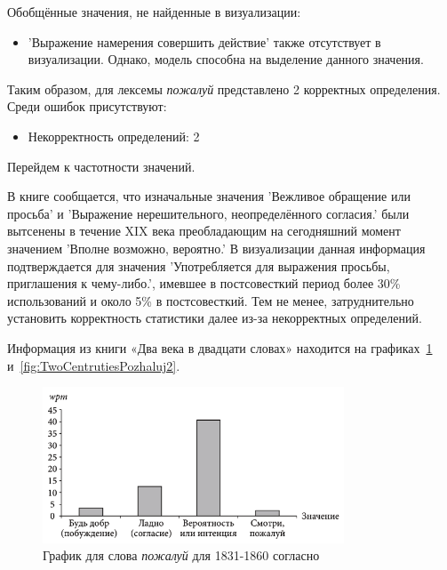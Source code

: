 Обобщённые значения, не найденные в визуализации:
\begin{itemize}
    \item ’Выражение намерения совершить действие’ также отсутствует в визуализации.
Однако, модель способна на выделение данного значения. %
\end{itemize}

Таким образом, для лексемы \textit{пожалуй} представлено 2 корректных определения.
Среди ошибок присутствуют:
\begin{itemize}
    \item Некорректность определений: 2
\end{itemize}

Перейдем к частотности значений.

В книге сообщается, что изначальные значения ’Вежливое обращение или просьба’
и ’Выражение нерешительного, неопределённого согласия.’ были вытсенены в течение XIX века
преобладающим на сегодняшний момент значением ’Вполне возможно, вероятно.’
В визуализации данная информация подтверждается для значения
’Употребляется для выражения просьбы, приглашения к чему-либо.’,
имевшее в постсовесткий период более 30\% использований и около 5\% в постсовесткий.
Тем не менее, затруднительно установить корректность статистики далее из-за
некорректных определений.

Информация из книги «Два века в двадцати словах» находится на графиках~\ref{fig:TwoCentrutiesPozhaluj1} и~\ref{fig:TwoCentrutiesPozhaluj2}.

\noindent %
\begin{figure}[H]
    \centering %
    \includegraphics[width=0.8\textwidth]{img/book/pozhaluj/1831-1860}
    \caption{График для слова \textit{пожалуй} для 1831-1860 согласно~\cite{TwoCenturies}}
    \label{fig:TwoCentrutiesPozhaluj1}
\end{figure}

